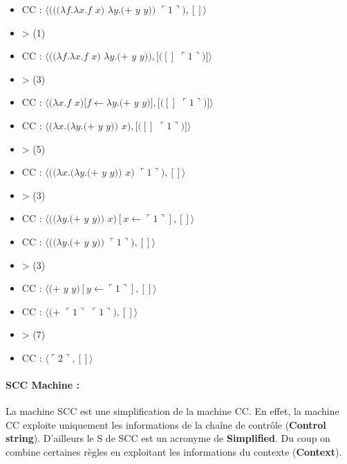 \documentclass[10pt,a4paper]{report}
\begin{document}
\begin{multicols}{2}\raggedright{
    \begin{itemize}
    \item[] CC : $\langle(((\lambda f.\lambda x.f$ $x)$ $\lambda y.(+$ $y$ $y))$ $\ulcorner 1\urcorner),[]\rangle$
    \item[] > (1) 
    \item[] CC : $\langle((\lambda f.\lambda x.f$ $x)$ $\lambda y.(+$ $y$ $y)),[([]$ $\ulcorner 1\urcorner)]\rangle$
    \item[] > (3)
    \item[] CC : $\langle(\lambda x.f$ $x)[f \leftarrow \lambda y.(+$ $y$ $y)],[([]$ $\ulcorner 1\urcorner)]\rangle$
    \item[] CC : $\langle(\lambda x.(\lambda y.(+$ $y$ $y))$ $x),[([]$ $\ulcorner 1\urcorner)]\rangle$
    \item[] > (5)
      
    \end{itemize}
    
    \begin{itemize}
    \item[] CC : $\langle((\lambda x.(\lambda y.(+$ $y$ $y))$ $x)$ $\ulcorner 1\urcorner),[]\rangle$
    \item[] > (3) 
    \item[] CC : $\langle((\lambda y.(+$ $y$ $y))$ $x)[x \leftarrow \ulcorner 1\urcorner],[]\rangle$
    \item[] CC : $\langle((\lambda y.(+$ $y$ $y))$ $\ulcorner 1\urcorner),[]\rangle$
    \item[] > (3) 
    \item[] CC : $\langle(+$ $y$ $y)[y \leftarrow \ulcorner 1\urcorner],[]\rangle$
    \item[] CC : $\langle(+$ $\ulcorner 1\urcorner$ $\ulcorner 1\urcorner),[]\rangle$
    \item[] > (7)
    \item[] CC : $\langle\ulcorner 2\urcorner,[]\rangle$
    \end{itemize}
  }
\end{multicols}




\paragraph{SCC Machine :}

La machine SCC est une simplification de la machine CC. En effet, la machine CC exploite uniquement les informations de la chaîne de contrôle (\textbf{Control string}). D'ailleurs le S de SCC est un acronyme de \textbf{Simplified}. Du coup on combine certaines règles en exploitant les informations du contexte (\textbf{Context}).
\bigbreak
\end{document}

